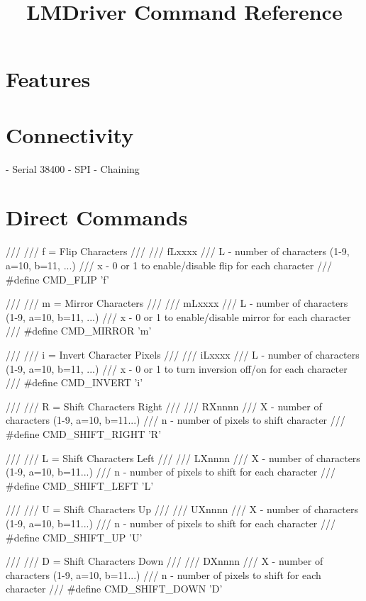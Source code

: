 \documentclass{article}
\begin{document}
\title{LMDriver Command Reference}

\section{Features}

\section{Connectivity}
- Serial 38400
- SPI
- Chaining


\section{Direct Commands}

///
/// \brief f = Flip Characters
/// 
/// \example fLxxxx
/// \param L - { number of characters (1-9, a=10, b=11, ...) }
/// \param x - 0 or 1 to enable/disable flip for each character
///
#define CMD_FLIP 'f'

///
/// \brief m = Mirror Characters
/// 
/// \example mLxxxx
/// \param L - { number of characters (1-9, a=10, b=11, ...) }
/// \param x - 0 or 1 to enable/disable mirror for each character
///
#define CMD_MIRROR 'm'

///
/// \brief i = Invert Character Pixels
/// 
/// \example iLxxxx
/// \param L - { number of characters (1-9, a=10, b=11, ...) }
/// \param x - 0 or 1 to turn inversion off/on for each character
///
#define CMD_INVERT 'i'

///
/// \brief R = Shift Characters Right
///  
/// \example RXnnnn
/// \param X - {number of characters (1-9, a=10, b=11...)}
/// \param n - number of pixels to shift character
///
#define CMD_SHIFT_RIGHT 'R'

///
/// \brief L = Shift Characters Left
/// 
/// \example LXnnnn
/// \param X - {number of characters (1-9, a=10, b=11...)}
/// \param n - number of pixels to shift for each character
///
#define CMD_SHIFT_LEFT 'L'

///
/// \brief U = Shift Characters Up
/// 
/// \example UXnnnn
/// \param X - {number of characters (1-9, a=10, b=11...)}
/// \param n - number of pixels to shift for each character
///
#define CMD_SHIFT_UP 'U'

///
/// \brief D = Shift Characters Down
/// 
/// \example DXnnnn
/// \param X - {number of characters (1-9, a=10, b=11...)}
/// \param n - number of pixels to shift for each character
///
#define CMD_SHIFT_DOWN 'D'
\end{document}
